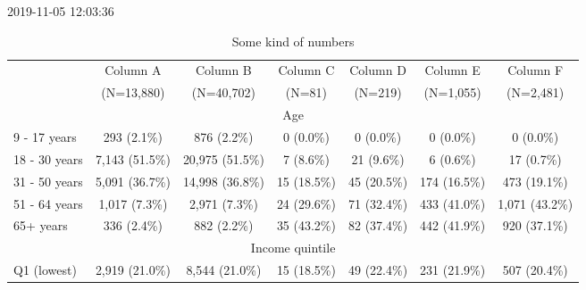 \documentclass{article}
\begin{document}
2019-11-05 12:03:36

\begin{table}[htbp]
\centering
\setlength{\tabcolsep}{0.5em}
\def\arraystretch{1.5}  
\caption{Some kind of numbers}
\begin{tabular}{l*{6}{c}}
\toprule
\multirow{2}{*}{                                                        }&     Column A     &  Column B  &     Column C    &  Column D &      Column E     &   Column F  \\
                                                        &           (N=13,880)           &           (N=40,702)           &             (N=81)             &             (N=219)            &            (N=1,055)           &            (N=2,481)           \\
\multicolumn{7}{c}{Age                                                     }\\
  9 - 17 years                                          &           293 (2.1\%)           &           876 (2.2\%)           &            0 (0.0\%)            &            0 (0.0\%)            &            0 (0.0\%)            &            0 (0.0\%)            \\
  18 - 30 years                                         &          7,143 (51.5\%)         &         20,975 (51.5\%)         &            7 (8.6\%)            &            21 (9.6\%)           &            6 (0.6\%)            &            17 (0.7\%)           \\
  31 - 50 years                                         &          5,091 (36.7\%)         &         14,998 (36.8\%)         &           15 (18.5\%)           &           45 (20.5\%)           &           174 (16.5\%)          &           473 (19.1\%)          \\
  51 - 64 years                                         &          1,017 (7.3\%)          &          2,971 (7.3\%)          &           24 (29.6\%)           &           71 (32.4\%)           &           433 (41.0\%)          &          1,071 (43.2\%)         \\
  65+ years                                             &           336 (2.4\%)           &           882 (2.2\%)           &           35 (43.2\%)           &           82 (37.4\%)           &           442 (41.9\%)          &           920 (37.1\%)          \\
\multicolumn{7}{c}{Income quintile                                         }\\
  Q1 (lowest)                                           &          2,919 (21.0\%)         &          8,544 (21.0\%)         &           15 (18.5\%)           &           49 (22.4\%)           &           231 (21.9\%)          &           507 (20.4\%)          \\

\end{tabular}
\end{table}
\end{document}
